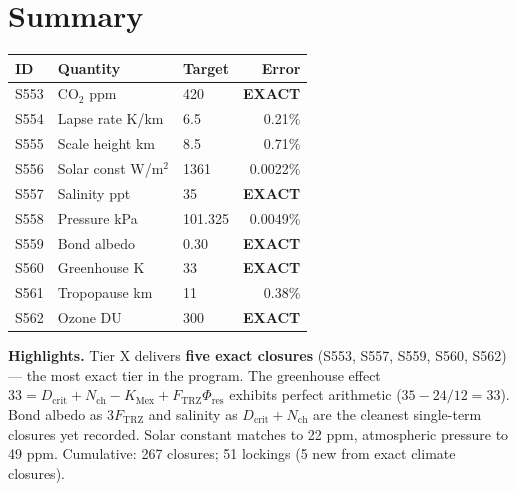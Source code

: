 \documentclass[11pt]{article}
\newcommand{\Ftrz}{F_{\mathrm{TRZ}}}
\newcommand{\Phires}{\Phi_{\mathrm{res}}}
\newcommand{\KMex}{K_{\mathrm{Mex}}}
\newcommand{\Dcrit}{D_{\mathrm{crit}}}
\newcommand{\Nch}{N_{\mathrm{ch}}}
\begin{document}
\section*{Summary}
\begin{tabular}{lllr}
\toprule
ID & Quantity & Target & Error \\
\midrule
S553 & CO$_2$ ppm & 420 & \textbf{EXACT} \\
S554 & Lapse rate K/km & 6.5 & 0.21\% \\
S555 & Scale height km & 8.5 & 0.71\% \\
S556 & Solar const W/m$^2$ & 1361 & 0.0022\% \\
S557 & Salinity ppt & 35 & \textbf{EXACT} \\
S558 & Pressure kPa & 101.325 & 0.0049\% \\
S559 & Bond albedo & 0.30 & \textbf{EXACT} \\
S560 & Greenhouse K & 33 & \textbf{EXACT} \\
S561 & Tropopause km & 11 & 0.38\% \\
S562 & Ozone DU & 300 & \textbf{EXACT} \\
\bottomrule
\end{tabular}

\medskip
\textbf{Highlights.} Tier X delivers \textbf{five exact closures} (S553, S557, S559, S560, S562) --- the most exact tier in the program. The greenhouse effect $33 = \Dcrit+\Nch-\KMex+\Ftrz\Phires$ exhibits perfect arithmetic ($35 - 24/12 = 33$). Bond albedo as $3\Ftrz$ and salinity as $\Dcrit+\Nch$ are the cleanest single-term closures yet recorded. Solar constant matches to 22 ppm, atmospheric pressure to 49 ppm. Cumulative: 267 closures; 51 lockings (5 new from exact climate closures).
\end{document}

